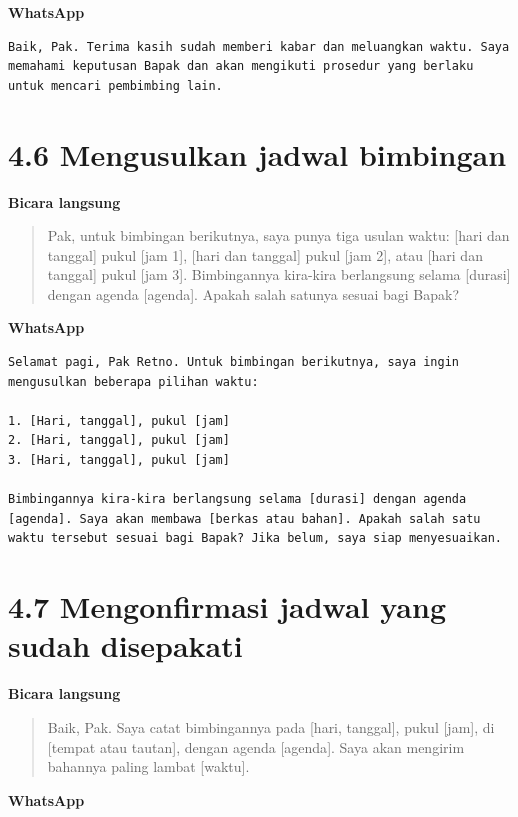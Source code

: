 \documentclass[
  indonesian,
]{article}
\renewcommand{\subsection}{\section}
\begin{document}
\textbf{WhatsApp}

\begin{verbatim}
Baik, Pak. Terima kasih sudah memberi kabar dan meluangkan waktu. Saya memahami keputusan Bapak dan akan mengikuti prosedur yang berlaku untuk mencari pembimbing lain.
\end{verbatim}

\subsection{4.6 Mengusulkan jadwal
bimbingan}\label{mengusulkan-jadwal-bimbingan}

\textbf{Bicara langsung}

\begin{quote}
Pak, untuk bimbingan berikutnya, saya punya tiga usulan waktu: {[}hari
dan tanggal{]} pukul {[}jam 1{]}, {[}hari dan tanggal{]} pukul {[}jam
2{]}, atau {[}hari dan tanggal{]} pukul {[}jam 3{]}. Bimbingannya
kira-kira berlangsung selama {[}durasi{]} dengan agenda {[}agenda{]}.
Apakah salah satunya sesuai bagi Bapak?
\end{quote}

\textbf{WhatsApp}

\begin{verbatim}
Selamat pagi, Pak Retno. Untuk bimbingan berikutnya, saya ingin mengusulkan beberapa pilihan waktu:

1. [Hari, tanggal], pukul [jam]
2. [Hari, tanggal], pukul [jam]
3. [Hari, tanggal], pukul [jam]

Bimbingannya kira-kira berlangsung selama [durasi] dengan agenda [agenda]. Saya akan membawa [berkas atau bahan]. Apakah salah satu waktu tersebut sesuai bagi Bapak? Jika belum, saya siap menyesuaikan.
\end{verbatim}

\subsection{4.7 Mengonfirmasi jadwal yang sudah
disepakati}\label{mengonfirmasi-jadwal-yang-sudah-disepakati}

\textbf{Bicara langsung}

\begin{quote}
Baik, Pak. Saya catat bimbingannya pada {[}hari, tanggal{]}, pukul
{[}jam{]}, di {[}tempat atau tautan{]}, dengan agenda {[}agenda{]}. Saya
akan mengirim bahannya paling lambat {[}waktu{]}.
\end{quote}

\textbf{WhatsApp}
\end{document}
